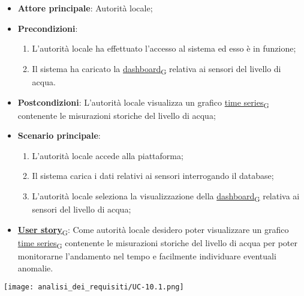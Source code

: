 \begin{itemize}
	\item \textbf{Attore principale}: Autorità locale;
	\item \textbf{Precondizioni}:
	      \begin{enumerate}
		      \item L'autorità locale ha effettuato l'accesso al sistema ed esso è in funzione;
		      \item Il sistema ha caricato la \href{https://7last.github.io/docs/rtb/documentazione-interna/glossario\#dashboard}{dashboard\textsubscript{G}} relativa ai sensori del livello di acqua.
	      \end{enumerate}
	\item \textbf{Postcondizioni}: L'autorità locale visualizza un grafico \href{https://7last.github.io/docs/rtb/documentazione-interna/glossario\#time-series}{time series\textsubscript{G}} contenente le misurazioni storiche
	      del livello di acqua;
	\item \textbf{Scenario principale}:
	      \begin{enumerate}
		      \item L'autorità locale accede alla piattaforma;
		      \item Il sistema carica i dati relativi ai sensori interrogando il database;
		      \item L'autorità locale seleziona la visualizzazione della \href{https://7last.github.io/docs/rtb/documentazione-interna/glossario\#dashboard}{dashboard\textsubscript{G}} relativa ai sensori del livello di acqua;
	      \end{enumerate}
	\item \href{https://7last.github.io/docs/rtb/documentazione-interna/glossario\#user-story}{\textbf{User story}\textsubscript{G}}:
	      Come autorità locale desidero poter visualizzare un grafico \href{https://7last.github.io/docs/rtb/documentazione-interna/glossario\#time-series}{time series\textsubscript{G}} contenente le misurazioni storiche
	      del livello di acqua per poter monitorarne l'andamento nel tempo e facilmente individuare eventuali anomalie.
\end{itemize}
\begin{center}
	\texttt{[image: analisi\_dei\_requisiti/UC-10.1.png]}
\end{center}

